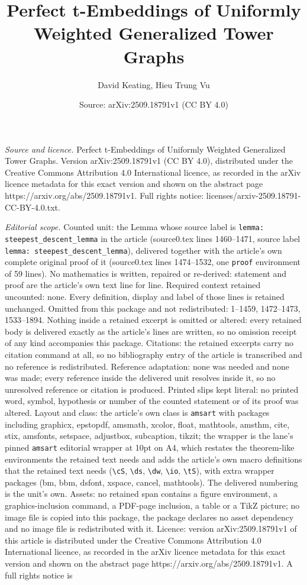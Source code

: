\documentclass[10pt,a4paper]{amsart}
\title[Perfect t-Embeddings of Uniformly Weighted Generalized Tower]{Perfect t-Embeddings of Uniformly Weighted Generalized Tower Graphs}
\author{David Keating, Hieu Trung Vu}
\date{Source: arXiv:2509.18791v1 (CC BY 4.0)}
\begin{document}
\maketitle

\noindent\emph{Source and licence.} Perfect t-Embeddings of Uniformly Weighted Generalized Tower Graphs. Version arXiv:2509.18791v1 (CC BY 4.0), distributed under the Creative Commons Attribution 4.0 International licence, as recorded in the arXiv licence metadata for this exact version and shown on the abstract page https://arxiv.org/abs/2509.18791v1. Full rights notice: licenses/arxiv-2509.18791-CC-BY-4.0.txt.\par\smallskip

\noindent\textit{Editorial scope.} Counted unit: the Lemma whose source label is \texttt{lemma: steepest\_descent\_lemma} in the article (source0.tex lines 1460--1471, source label \texttt{lemma: steepest\_descent\_lemma}), delivered together with the article's own complete original proof of it (source0.tex lines 1474--1532, one \texttt{proof} environment of 59 lines). No mathematics is written, repaired or re-derived: statement and proof are the article's own text line for line. Required context retained uncounted: none. Every definition, display and label of those lines is retained unchanged. Omitted from this package and not redistributed: 1--1459, 1472--1473, 1533--1894. Nothing inside a retained excerpt is omitted or altered: every retained body is delivered exactly as the article's lines are written, so no omission receipt of any kind accompanies this package. Citations: the retained excerpts carry no citation command at all, so no bibliography entry of the article is transcribed and no reference is redistributed. Reference adaptation: none was needed and none was made; every reference inside the delivered unit resolves inside it, so no unresolved reference or citation is produced. Printed slips kept literal: no printed word, symbol, hypothesis or number of the counted statement or of its proof was altered. Layout and class: the article's own class is \texttt{amsart} with packages including graphicx, epstopdf, amsmath, xcolor, float, mathtools, amsthm, cite, stix, amsfonts, setspace, adjustbox, subcaption, tikzit; the wrapper is the lane's pinned \texttt{amsart} editorial wrapper at 10pt on A4, which restates the theorem-like environments the retained text needs and adds the article's own macro definitions that the retained text needs (\texttt{\textbackslash cS}, \texttt{\textbackslash ds}, \texttt{\textbackslash dw}, \texttt{\textbackslash io}, \texttt{\textbackslash tS}), with extra wrapper packages (bm, bbm, dsfont, xspace, cancel, mathtools). The delivered numbering is the unit's own. Assets: no retained span contains a figure environment, a graphics-inclusion command, a PDF-page inclusion, a table or a TikZ picture; no image file is copied into this package, the package declares no asset dependency and no image file is redistributed with it. Licence: version arXiv:2509.18791v1 of this article is distributed under the Creative Commons Attribution 4.0 International licence, as recorded in the arXiv licence metadata for this exact version and shown on the abstract page https://arxiv.org/abs/2509.18791v1. A full rights notice is 
\end{document}
